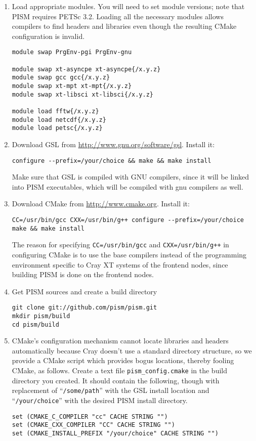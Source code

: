 \documentclass[titlepage,letterpaper,final]{scrartcl}
\begin{document}
\begin{enumerate}
\item Load appropriate modules.  You will need to set module versions; note
  that PISM requires PETSc 3.2.  Loading all the necessary modules allows
  compilers to find headers and libraries even though the resulting CMake
  configuration is invalid.
\begin{verbatim}
module swap PrgEnv-pgi PrgEnv-gnu

module swap xt-asyncpe xt-asyncpe{/x.y.z}
module swap gcc gcc{/x.y.z}
module swap xt-mpt xt-mpt{/x.y.z}
module swap xt-libsci xt-libsci{/x.y.z}

module load fftw{/x.y.z}
module load netcdf{/x.y.z}
module load petsc{/x.y.z}
\end{verbatim}
\item Download GSL from \url{http://www.gnu.org/software/gsl}.  Install it:
\begin{verbatim}
configure --prefix=/your/choice && make && make install
\end{verbatim}
  Make sure that GSL is compiled with GNU compilers, since it will be linked
  into PISM executables, which will be compiled with gnu compilers as well.
\item Download CMake from \url{http://www.cmake.org}.  Install it:
\begin{verbatim}
CC=/usr/bin/gcc CXX=/usr/bin/g++ configure --prefix=/your/choice
make && make install
\end{verbatim}
  The reason for specifying \texttt{CC=/usr/bin/gcc} and \texttt{CXX=/usr/bin/g++} in
  configuring CMake is to use the base compilers instead of the programming
  environment specific to Cray XT systems of the frontend nodes, since building
  PISM is done on the frontend nodes.
\item Get PISM sources and create a build directory
\begin{verbatim}
git clone git://github.com/pism/pism.git
mkdir pism/build
cd pism/build
\end{verbatim}
\item CMake's configuration mechanism cannot locate libraries and headers
automatically because Cray doesn't use a standard directory structure, so we provide a
CMake script which provides bogus locations, thereby fooling CMake, as follows.
Create a text file \texttt{pism_config.cmake} in the build directory you
created. It should contain the following, though with replacement of
``\texttt{/some/path}'' with the GSL install location and
``\texttt{/your/choice}'' with the desired PISM install directory.
\begin{verbatim}
set (CMAKE_C_COMPILER "cc" CACHE STRING "") 
set (CMAKE_CXX_COMPILER "CC" CACHE STRING "")
set (CMAKE_INSTALL_PREFIX "/your/choice" CACHE STRING "")


\end{verbatim}
\end{enumerate}
\end{document}
